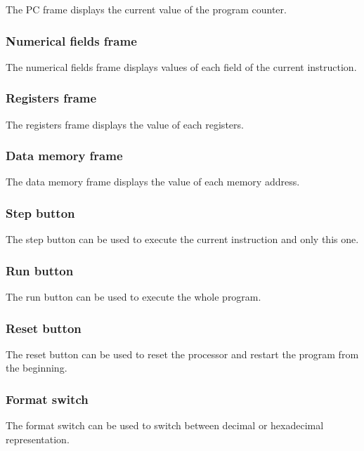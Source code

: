 		The PC frame displays the current value of the program counter.
		
	\subsubsection{Numerical fields frame}
	
		The numerical fields frame displays values of each field of the current instruction.
		
	\subsubsection{Registers frame}
	
		The registers frame displays the value of each registers.
	
	\subsubsection{Data memory frame}
	
		The data memory frame displays the value of each memory address.
		
	\subsubsection{Step button}
	
		The step button can be used to execute the current instruction and only this one.
	
	\subsubsection{Run button}
	
		The run button can be used to execute the whole program.
		
	\subsubsection{Reset button}
	
		The reset button can be used to reset the processor and restart the program from the beginning.
		
	\subsubsection{Format switch}
	
		The format switch can be used to switch between decimal or hexadecimal representation.